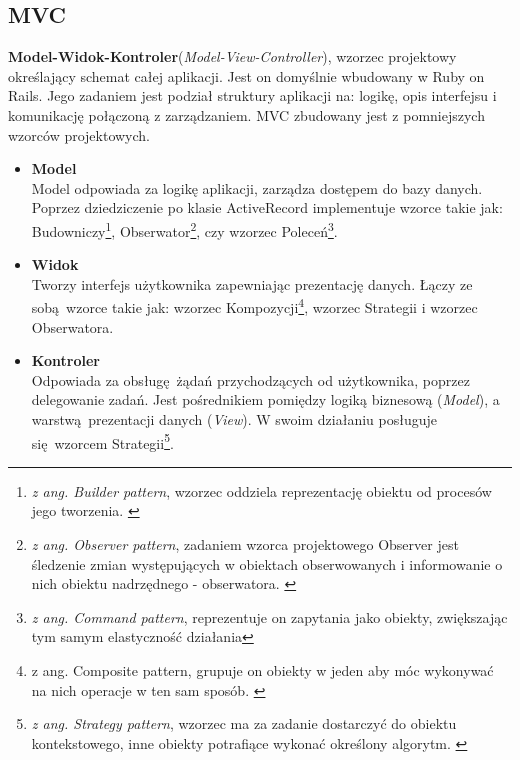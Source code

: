   \subsection{MVC}
   \textbf{Model-Widok-Kontroler}(\emph{Model-View-Controller}), wzorzec projektowy określający schemat całej aplikacji. Jest on domyślnie wbudowany w Ruby on Rails. Jego zadaniem jest podział struktury aplikacji na: logikę, opis interfejsu i komunikację połączoną z zarządzaniem.
   MVC zbudowany jest z pomniejszych wzorców projektowych.
    \begin{itemize}
      \item \textbf {Model} \\
      Model odpowiada za logikę aplikacji, zarządza dostępem do bazy danych.
      Poprzez dziedziczenie po klasie ActiveRecord implementuje wzorce takie jak: Budowniczy\footnote{\emph{z ang. Builder pattern}, wzorzec oddziela reprezentację obiektu od procesów jego tworzenia. \cite{ruby_patterns}}, Obserwator\footnote{\emph{z ang. Observer pattern}, zadaniem wzorca projektowego Observer jest śledzenie zmian występujących w obiektach obserwowanych i informowanie o nich obiektu nadrzędnego - obserwatora. \cite{ruby_patterns}}, czy wzorzec Poleceń\footnote{\emph{z ang. Command pattern}, reprezentuje on zapytania jako obiekty, zwiększając tym samym elastyczność działania\cite{ruby_patterns}}.

      \item \textbf {Widok} \\
      Tworzy interfejs użytkownika zapewniając prezentację danych. Łączy ze sobą wzorce takie jak: wzorzec Kompozycji\footnote{z ang. Composite pattern, grupuje on obiekty w jeden aby móc wykonywać na nich operacje w ten sam sposób. \cite{ruby_patterns}}, wzorzec Strategii i wzorzec Obserwatora.

      \item \textbf {Kontroler} \\
      Odpowiada za obsługę żądań przychodzących od użytkownika, poprzez delegowanie zadań. Jest pośrednikiem pomiędzy logiką biznesową (\emph{Model}), a warstwą prezentacji danych (\emph{View}). W swoim działaniu posługuje się wzorcem Strategii\footnote{ \emph{z ang. Strategy pattern}, wzorzec ma za zadanie dostarczyć do obiektu kontekstowego, inne obiekty potrafiące wykonać określony algorytm. \cite{ruby_patterns}}.
    \end{itemize}

